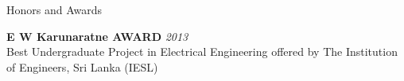 \documentclass[
11pt, %
]{./assets/resume} %
\begin{document}
 



\begin{rSection}{Honors and Awards}

	\textbf{E W Karunaratne AWARD} \hfill \textit{2013}\\
	Best Undergraduate Project in Electrical Engineering offered by The Institution of Engineers, Sri Lanka (IESL)

\end{rSection}



\end{document}
